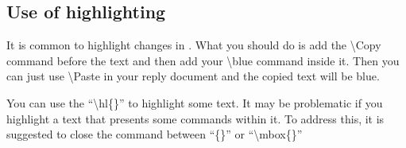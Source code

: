 \documentclass[main.tex]{subfiles}
\begin{document}
\begin{guidance}
\subsection{Use of highlighting}
It is common to highlight changes in . What you should do is add the \textbackslash Copy command before the text and then add your \textbackslash blue command inside it. Then you can just use \textbackslash Paste in your reply document and the copied text will be blue.

You can use the ``\textbackslash hl\{\}'' to highlight some text.
It may be problematic if you highlight a text that presents some commands within it. To address this, it is suggested to close the command between ``\{\}'' or ``\textbackslash mbox\{\}''
\end{guidance}
\end{document}
